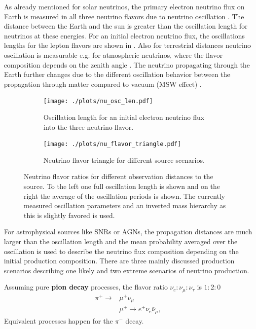 As already mentioned for solar neutrinos, the primary electron neutrino flux on Earth is measured in all three neutrino flavors due to neutrino oscillation \cite{SNO01Oscillation}.
The distance between the Earth and the sun is greater than the oscillation length for neutrinos at these energies.
For an initial electron neutrino flux, the oscillations lengths for the lepton flavors are shown in .
Also for terrestrial distances neutrino oscillation is measurable e.g. for atmospheric neutrinos, where the flavor composition depends on the zenith angle \cite{SK98Oscillation}.
The neutrino propagating through the Earth further changes due to the different oscillation behavior between the propagation through matter compared to vacuum (MSW effect) \cite{Mikheyev85, Wolfenstein79}.
\begin{figure}
    \centering
    \begin{subfigure}[t]{0.47\textwidth}
        \centering
        \texttt{[image: ./plots/nu\_osc\_len.pdf]}
        \caption{Oscillation length for an initial electron neutrino flux into the three neutrino flavor.}
        \label{fig:nu_osc_len}
    \end{subfigure}
    \hfill
    \begin{subfigure}[t]{0.47\textwidth}
        \centering
        \texttt{[image: ./plots/nu\_flavor\_triangle.pdf]}
        \caption{Neutrino flavor triangle for different source scenarios.}
        \label{fig:nu_flavor_trangle}
    \end{subfigure}
    \caption{Neutrino flavor ratios for different observation distances to the source. To the left one full oscillation length is shown and on the right the average of the oscillation periods is shown. The currently measured oscillation parameters \cite{PDG20} and  an inverted mass hierarchy as this is slightly favored is used.}
    \label{fig:nu_osc}
\end{figure}

For astrophysical sources like SNRs or AGNs, the propagation distances are much larger than the oscillation length and the mean probability averaged over the oscillation is used to describe the neutrino flux composition depending on the initial production composition.
There are three mainly discussed production scenarios describing one likely and two extreme scenarios of neutrino production.

Assuming pure \textbf{pion decay} processes, the flavor ratio $\nu_e : \nu_{\mu} : \nu_{\tau}$ is $1:2:0$
\begin{align}
    \pi^+ \to &\mu^+ \nu_\mu \\
    &\mu^+ \to e^+ \nu_e \bar{\nu}_{\mu} ,
\end{align}
Equivalent processes happen for the $\pi^-$ decay.

